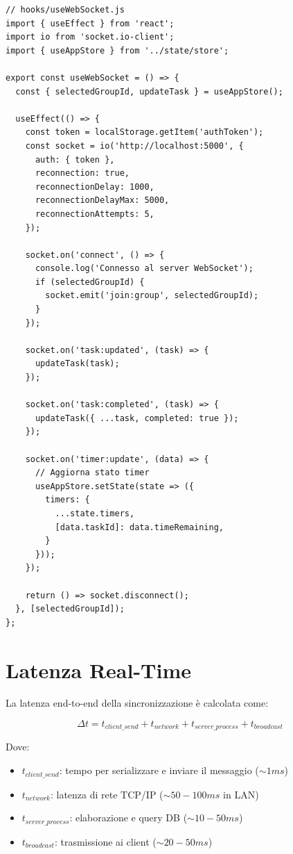 \documentclass[12pt,a4paper]{report}
\begin{document}
\begin{lstlisting}
// hooks/useWebSocket.js
import { useEffect } from 'react';
import io from 'socket.io-client';
import { useAppStore } from '../state/store';

export const useWebSocket = () => {
  const { selectedGroupId, updateTask } = useAppStore();
  
  useEffect(() => {
    const token = localStorage.getItem('authToken');
    const socket = io('http://localhost:5000', {
      auth: { token },
      reconnection: true,
      reconnectionDelay: 1000,
      reconnectionDelayMax: 5000,
      reconnectionAttempts: 5,
    });
    
    socket.on('connect', () => {
      console.log('Connesso al server WebSocket');
      if (selectedGroupId) {
        socket.emit('join:group', selectedGroupId);
      }
    });
    
    socket.on('task:updated', (task) => {
      updateTask(task);
    });
    
    socket.on('task:completed', (task) => {
      updateTask({ ...task, completed: true });
    });
    
    socket.on('timer:update', (data) => {
      // Aggiorna stato timer
      useAppStore.setState(state => ({
        timers: {
          ...state.timers,
          [data.taskId]: data.timeRemaining,
        }
      }));
    });
    
    return () => socket.disconnect();
  }, [selectedGroupId]);
};
\end{lstlisting}

\section{Latenza Real-Time}

La latenza end-to-end della sincronizzazione è calcolata come:

$$\Delta t = t_{client\_send} + t_{network} + t_{server\_process} + t_{broadcast}$$

Dove:
\begin{itemize}
    \item $t_{client\_send}$: tempo per serializzare e inviare il messaggio ($\sim 1ms$)
    \item $t_{network}$: latenza di rete TCP/IP ($\sim 50-100ms$ in LAN)
    \item $t_{server\_process}$: elaborazione e query DB ($\sim 10-50ms$)
    \item $t_{broadcast}$: trasmissione ai client ($\sim 20-50ms$)
\end{itemize}
\end{document}
